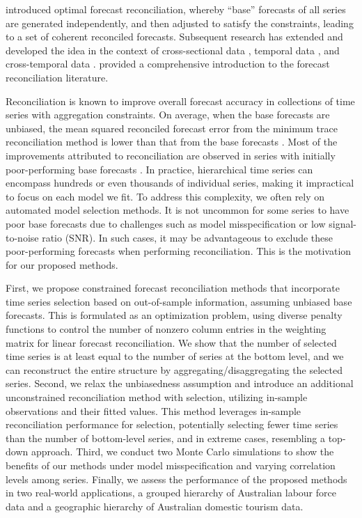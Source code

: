 \documentclass[
  11pt]{article}
\theoremstyle{plain}
\theoremstyle{remark}
\begin{document}
\citet{Hyndman2011-sd} introduced optimal forecast reconciliation,
whereby ``base'' forecasts of all series are generated independently,
and then adjusted to satisfy the constraints, leading to a set of
coherent reconciled forecasts. Subsequent research has extended and
developed the idea in the context of cross-sectional data
\citep{Hyndman2016-cz, Wickramasuriya2019-fc, Panagiotelis2021-mf},
temporal data \citep{Athanasopoulos2017-jj}, and cross-temporal data
\citep{Di_Fonzo2023-vo}. \citet{Athanasopoulos2024-sm} provided a
comprehensive introduction to the forecast reconciliation literature.

Reconciliation is known to improve overall forecast accuracy in
collections of time series with aggregation constraints. On average,
when the base forecasts are unbiased, the mean squared reconciled
forecast error from the minimum trace reconciliation method
\citep{Wickramasuriya2019-fc} is lower than that from the base forecasts
\citep{Wickramasuriya2021-am}. Most of the improvements attributed to
reconciliation are observed in series with initially poor-performing
base forecasts \citep{Athanasopoulos2017-jj}. In practice, hierarchical
time series can encompass hundreds or even thousands of individual
series, making it impractical to focus on each model we fit. To address
this complexity, we often rely on automated model selection methods. It
is not uncommon for some series to have poor base forecasts due to
challenges such as model misspecification or low signal-to-noise ratio
(SNR). In such cases, it may be advantageous to exclude these
poor-performing forecasts when performing reconciliation. This is the
motivation for our proposed methods.

First, we propose constrained forecast reconciliation methods that
incorporate time series selection based on out-of-sample information,
assuming unbiased base forecasts. This is formulated as an optimization
problem, using diverse penalty functions to control the number of
nonzero column entries in the weighting matrix for linear forecast
reconciliation. We show that the number of selected time series is at
least equal to the number of series at the bottom level, and we can
reconstruct the entire structure by aggregating/disaggregating the
selected series. Second, we relax the unbiasedness assumption and
introduce an additional unconstrained reconciliation method with
selection, utilizing in-sample observations and their fitted values.
This method leverages in-sample reconciliation performance for
selection, potentially selecting fewer time series than the number of
bottom-level series, and in extreme cases, resembling a top-down
approach. Third, we conduct two Monte Carlo simulations to show the
benefits of our methods under model misspecification and varying
correlation levels among series. Finally, we assess the performance of
the proposed methods in two real-world applications, a grouped hierarchy
of Australian labour force data and a geographic hierarchy of Australian
domestic tourism data.
\end{document}
